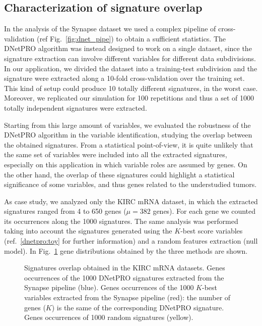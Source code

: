 \documentclass{standalone}
\begin{document}
\subsection[Signature Overlap]{Characterization of signature overlap}\label{synapse:overlap}

In the analysis of the Synapse dataset we used a complex pipeline of cross-validation (ref Fig.~\ref{fig:dnet_pipe}) to obtain a sufficient statistics.
The \textsf{DNetPRO} algorithm was instead designed to work on a single dataset, since the signature extraction can involve different variables for different data subdivisions.
In our application, we divided the dataset into a training-test subdivision and the signature were extracted along a 10-fold cross-validation over the training set.
This kind of setup could produce 10 totally different signatures, in the worst case.
Moreover, we replicated our simulation for 100 repetitions and thus a set of 1000 totally independent signatures were extracted.

Starting from this large amount of variables, we evaluated the robustness of the \textsf{DNetPRO} algorithm in the variable identification, studying the overlap between the obtained signatures.
From a statistical point-of-view, it is quite unlikely that the same set of variables were included into all the extracted signatures, especially on this application in which variable roles are assumed by genes.
On the other hand, the overlap of these signatures could highlight a statistical significance of some variables, and thus genes related to the understudied tumors.

As case study, we analyzed only the KIRC mRNA dataset, in which the extracted signatures ranged from 4 to 650 genes ($\mu=382$ genes).
For each gene we counted its occurrences along the 1000 signatures.
The same analysis was performed taking into account the signatures generated using the $K$-best score variables (ref.~\ref{dnetpro:toy} for further information) and a random features extraction (null model).
In Fig.~\ref{fig:overlap} gene distributions obtained by the three methods are shown.

\begin{figure}[htbp]
\centering
\def\svgwidth{0.6\textwidth}

\caption{Signatures overlap obtained in the KIRC mRNA datasets.
Genes occurrences of the 1000 \textsf{DNetPRO} signatures extracted from the Synapse pipeline (blue).
Genes occurrences of the 1000 $K$-best variables extracted from the Synapse pipeline (red): the number of genes ($K$) is the same of the corresponding \textsf{DNetPRO} signature.
Genes occurrences of 1000 random signatures (yellow).
}
\label{fig:overlap}
\end{figure}
\end{document}
